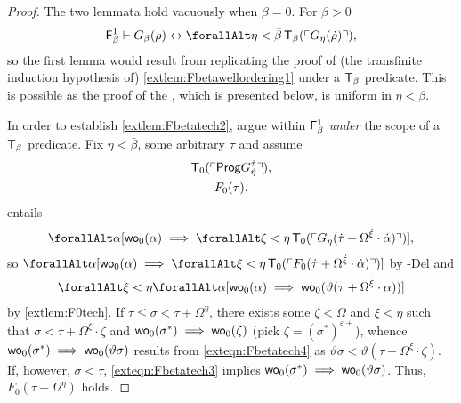 \documentclass[UKenglish,cleveref,DIV=12]{scrartcl}
\let\forall\forallAlt
\theoremstyle{definition}
\theoremstyle{definition}
\begin{document}
\begin{proof}
The two lemmata hold vacuously when $\beta=0$. For $\beta>0$
\begin{align*}
 \F_\beta^1\proves G_\beta(\rho)\equi \forall\eta<\bar\beta\,\T_\beta(\gn{G_\eta(\dot\rho)}),
\end{align*}
so the first lemma would result from replicating the proof of (the transfinite
induction hypothesis of) \cref{extlem:Fbetawellordering1} under a $\mathsf{T}_\beta$
predicate. This is possible as the proof of the , which is presented below, is
uniform in $\eta<\beta$.

In order to establish \cref{extlem:Fbetatech2}, argue within $\mathsf{F}_\beta^1$ {\em under} the scope of a $\mathsf{T}_\beta$ predicate. Fix $\eta<\bar\beta$, some arbitrary $\tau$ and assume
\begin{gather}
  \mathsf{T}_0(\ulcorner{\mathsf{Prog}G_{\dot \eta}^{\dot\tau}}\urcorner),\label{exteqn:Fbetatech2}\\
  F_0(\tau).\label{exteqn:Fbetatech3}
\end{gather}
 entails
\begin{gather*}
  \forall\alpha [\wo_0(\alpha)\implies \forall\xi<\eta\,\T_0(\gn{G_\eta(\dot\tau+\Omega^{\dot\xi}\cdot\dot\alpha)})],
\end{gather*}
so $\forall\alpha[\wo_0(\alpha)\implies \forall\xi<\eta\,\T_0(\gn{F_0(\dot\tau+\Omega^{\dot\xi}\cdot\dot\alpha)})]$ by -Del and
\begin{align}\label{exteqn:Fbetatech4}
  \forall\xi<\eta\forall\alpha [\wo_0(\alpha)\implies\wo_0(\vartheta(\tau+\Omega^\xi\cdot\alpha))]
\end{align}
by \cref{extlem:F0tech}. If $\tau\le\sigma<\tau+\Omega^\eta$, there exists some
$\zeta<\Omega$ and $\xi<\eta$ such that $\sigma<\tau+\Omega^\xi\cdot\zeta$
and $\mathsf{wo}_0(\sigma^*)\implies \mathsf{wo}_0(\zeta)$ (pick
$\zeta=(\sigma^*)^{\varepsilon+}$), whence $\mathsf{wo}_0(\sigma^*)\implies
\mathsf{wo}_0(\vartheta\sigma)$ results from \cref{exteqn:Fbetatech4} as
$\vartheta\sigma<\vartheta(\tau+\Omega^\xi\cdot\zeta)$. If, however,
$\sigma<\tau$, \cref{exteqn:Fbetatech3} implies $\mathsf{wo}_0(\sigma^*)\implies
\mathsf{wo}_0(\vartheta\sigma)$. Thus, $F_0(\tau+\Omega^\eta)$ holds.
\end{proof}
\end{document}
